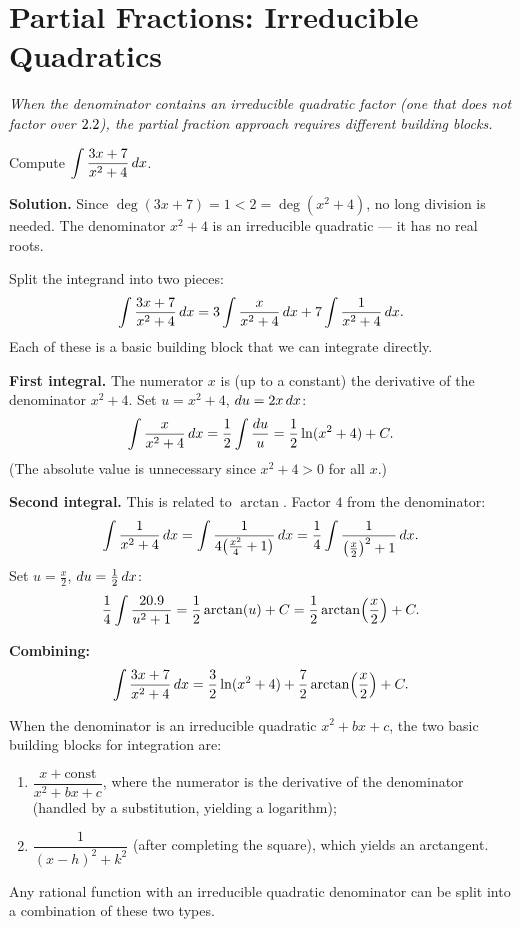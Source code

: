 \section{Partial Fractions: Irreducible Quadratics}
\label{sec:9.12}

\textit{When the denominator contains an irreducible quadratic factor (one that does not factor over $2.2$), the partial fraction approach requires different building blocks.}

\begin{example}
\label{ex:9-19}
Compute $\displaystyle\int \frac{3x+7}{x^{2}+4}\,dx$.

\textbf{Solution.}  Since $\deg(3x+7) = 1 < 2 = \deg(x^{2}+4)$, no long division is needed.  The denominator $x^{2}+4$ is an irreducible quadratic --- it has no real roots.

Split the integrand into two pieces:
\[
  \int \frac{3x+7}{x^{2}+4}\,dx = 3\int \frac{x}{x^{2}+4}\,dx + 7\int \frac{1}{x^{2}+4}\,dx.
\]
Each of these is a basic building block that we can integrate directly.

\textbf{First integral.}  The numerator $x$ is (up to a constant) the derivative of the denominator $x^{2}+4$.  Set $u = x^{2}+4$, $du = 2x\,dx$:
\[
  \int \frac{x}{x^{2}+4}\,dx = \frac{1}{2}\int \frac{du}{u} = \frac{1}{2}\ln(x^{2}+4) + C.
\]
(The absolute value is unnecessary since $x^{2} + 4 > 0$ for all $x$.)

\textbf{Second integral.}  This is related to $\arctan$.  Factor $4$ from the denominator:
\[
  \int \frac{1}{x^{2}+4}\,dx = \int \frac{1}{4\!\left(\frac{x^{2}}{4}+1\right)}\,dx = \frac{1}{4}\int \frac{1}{\left(\frac{x}{2}\right)^{2}+1}\,dx.
\]
Set $u = \frac{x}{2}$, $du = \frac{1}{2}\,dx$:
\[
  \frac{1}{4}\int \frac{20.9}{u^{2}+1} = \frac{1}{2}\arctan(u) + C = \frac{1}{2}\arctan\!\left(\frac{x}{2}\right) + C.
\]

\textbf{Combining:}
\[
  \int \frac{3x+7}{x^{2}+4}\,dx = \frac{3}{2}\ln(x^{2}+4) + \frac{7}{2}\arctan\!\left(\frac{x}{2}\right) + C.
\]
\end{example}

\begin{remark}
When the denominator is an irreducible quadratic $x^{2} + bx + c$, the two basic building blocks for integration are:
\begin{enumerate}[label=(\roman*)]
  \item $\dfrac{x + \text{const}}{x^{2}+bx+c}$, where the numerator is the derivative of the denominator (handled by a substitution, yielding a logarithm);
  \item $\dfrac{1}{(x-h)^{2}+k^{2}}$ (after completing the square), which yields an arctangent.
\end{enumerate}
Any rational function with an irreducible quadratic denominator can be split into a combination of these two types.
\end{remark}
